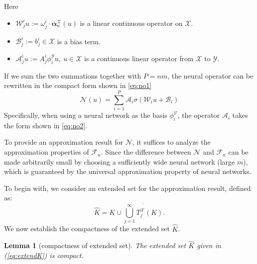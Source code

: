 \documentclass[preprint,12pt]{elsarticle}
\theoremstyle{plain}
\newtheorem{lemma}[theorem]{Lemma}
\numberwithin{figure}{section}
\numberwithin{table}{section}
\begin{document}
Here 
\begin{itemize}
	\item $\mathcal{W}_j^iu:=\omega_j^i\cdot \bm{\alpha}^\mathcal{X}_n(u)$ is a linear continuous operator on $\mathcal{X}$.
	\item $\mathcal{B}_j^i:=b_j^i\in \mathcal{X}$ is a bias term.
	\item $\mathcal{A}_j^iu:={A}_j^i\phi_i^\mathcal{Y}u,~u\in\mathcal{X}$ is a continuous linear operator from $\mathcal{X}$ to $\mathcal{Y}$.
\end{itemize}
If we sum the two summations together with $P = nm$, the neural operator can be rewritten in the compact form shown in \eqref{eq:no1}
\begin{equation}
	\mathcal{N}(u)=\sum_{i=1}^P \mathcal{A}_i\sigma(\mathcal{W}_iu+\mathcal{B}_i)
\end{equation}
Specifically, when using a neural network as the basis $\phi_i^\mathcal{V}$, the operator $\mathcal{A}_i$ takes the form shown in \eqref{eq:no2}.

To provide an approximation result for $\mathcal{N}$, it suffices to analyze the approximation properties of $\mathcal{F}_n$. Since the difference between $\mathcal{N}$ and $\mathcal{F}_n$ can be made arbitrarily small by choosing a sufficiently wide neural network (large $m$), which is guaranteed by the universal approximation property of neural networks.


To begin with, we consider an extended set for the approximation result, defined as:
\begin{equation}\label{eq:extendK}
	\widehat{K} = K \cup \overline{\bigcup_{j=1}^{\infty}T^{\mathcal{X}}_{j}(K)}.
\end{equation}
We now establish the compactness of the extended set $\widehat{K}$.

\begin{lemma}[compactness of extended set]\label{lem:ext}
	The extended set $\widehat{K}$ given in (\ref{eq:extendK}) is compact.
\end{lemma}
\end{document}
